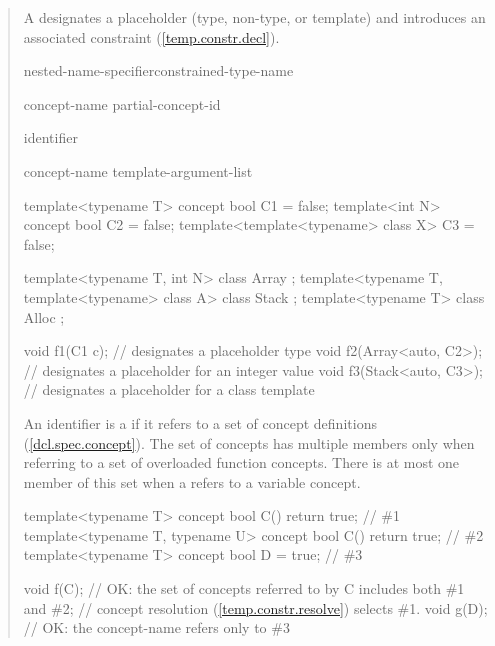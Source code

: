 \begin{quote}
A  designates a placeholder
(type, non-type, or template) and introduces an associated constraint
(\ref{temp.constr.decl}).

\begin{bnf}
\br
		nested-name-specifier\opt constrained-type-name

\br
  concept-name\br
  partial-concept-id

\br
  identifier

\br
		concept-name \terminal{<} template-argument-list\opt \terminal{>}
\end{bnf}

\enterexample
\begin{codeblock}
template<typename T> concept bool C1 = false;
template<int N> concept bool C2 = false;
template<template<typename> class X> C3 = false;

template<typename T, int N> class Array { };
template<typename T, template<typename> class A> class Stack { };
template<typename T> class Alloc { };

void f1(C1 c);            //  designates a placeholder type
void f2(Array<auto, C2>); //  designates a placeholder for an integer value
void f3(Stack<auto, C3>); //  designates a placeholder for a class template
\end{codeblock}
\exitexample

\pnum
An identifier is a  if it refers to a set of 
concept definitions (\ref{dcl.spec.concept}).
%
\enternote
The set of concepts has multiple members only when referring to a set of 
overloaded function concepts. There is at most one member of this set when a
 refers to a variable concept.
\exitnote
%
\enterexample
\begin{codeblock}
template<typename T> concept bool C() { return true; }             // \#1
template<typename T, typename U> concept bool C() { return true; } // \#2
template<typename T> concept bool D = true;                        // \#3

void f(C); // OK: the set of concepts referred to by C includes both \#1 and \#2;
           // concept resolution (\ref{temp.constr.resolve}) selects \#1.
void g(D); // OK: the concept-name  refers only to \#3
\end{codeblock}
\exitexample


\end{quote}
